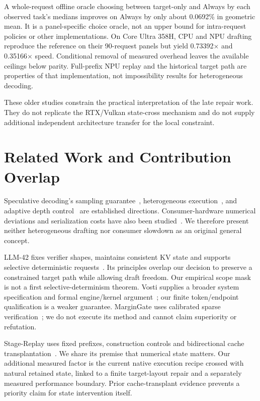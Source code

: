 \documentclass{article}
\begin{document}
A whole-request offline oracle choosing between target-only and Always by each observed task's medians improves on Always by only about 0.0692\% in geometric mean. It is a panel-specific choice oracle, not an upper bound for intra-request policies or other implementations. On Core Ultra 358H, CPU and NPU drafting reproduce the reference on their 90-request panels but yield 0.73392$\times$ and 0.35166$\times$ speed. Conditional removal of measured overhead leaves the available ceilings below parity. Full-prefix NPU replay and the historical target path are properties of that implementation, not impossibility results for heterogeneous decoding.

These older studies constrain the practical interpretation of the late repair work. They do not replicate the RTX/Vulkan state-cross mechanism and do not supply additional independent architecture transfer for the local constraint.

\section{Related Work and Contribution Overlap}
Speculative decoding's sampling guarantee~\cite{leviathan2023}, heterogeneous execution~\cite{dovetail,duodecoding}, and adaptive depth control~\cite{turbospec,banditspec} are established directions. Consumer-hardware numerical deviations and serialization costs have also been studied~\cite{lossless}. We therefore present neither heterogeneous drafting nor consumer slowdown as an original general concept.

LLM-42 fixes verifier shapes, maintains consistent KV state and supports selective deterministic requests~\cite{llm42}. Its principles overlap our decision to preserve a constrained target path while allowing draft freedom. Our empirical scope mask is not a first selective-determinism theorem. Vosti supplies a broader system specification and formal engine/kernel argument~\cite{vosti}; our finite token/endpoint qualification is a weaker guarantee. MarginGate uses calibrated sparse verification~\cite{margingate}; we do not execute its method and cannot claim superiority or refutation.

Stage-Replay uses fixed prefixes, construction controls and bidirectional cache transplantation~\cite{stagereplay}. We share its premise that numerical state matters. Our additional measured factor is the current native execution recipe crossed with natural retained state, linked to a finite target-layout repair and a separately measured performance boundary. Prior cache-transplant evidence prevents a priority claim for state intervention itself.
\end{document}
